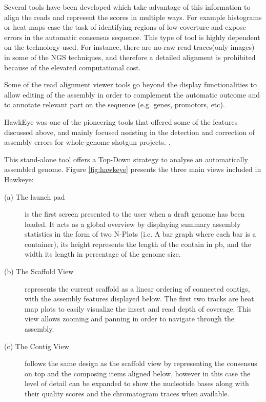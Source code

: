 Several tools have been developed which take advantage of this information to align the reads and represent the scores in multiple ways. For example histograms or heat maps ease the task of identifying regions of low coverture and expose errors in the automatic consensus sequence. This type of tool is highly dependent on the technology used. For instance, there are no raw read traces(only images) in some of the NGS techniques, and therefore a detailed alignment is prohibited because of the elevated computational cost.

Some of the read alignment viewer tools go beyond the display functionalities to allow editing of the assembly in order to complement the automatic outcome and to annotate relevant part on the sequence (e.g. genes, promotors, etc).

HawkEye was one of the pioneering tools that offered some of the features discussed above, and mainly focused assisting in the detection and correction of assembly errors for whole-genome shotgun projects. \cite{SCH2007}. 

This stand-alone tool offers a Top-Down strategy to analyse an automatically assembled genome. Figure \ref{fig:hawkeye} presents the three main views included in Hawkeye: 
\begin{description}
\item[(a) The launch pad] is the first screen presented to the user when a draft genome has been loaded. It acts as a global overview by displaying summary assembly statistics in the form of two N-Plots (i.e. A bar graph where each bar is a container), its height represents the length of the contain in pb, and the width its length in percentage of the genome size.
\item[(b) The Scaffold View] represents the current scaffold as a linear ordering of connected contigs, with the assembly features displayed below. The first two tracks are heat map plots to easily visualize the insert and read depth of coverage. This view allows zooming and panning in order to navigate through the assembly.
\item[(c) The Contig View] follows the same design as the scaffold view by representing the consensus on top and the composing items aligned below, however in this case the level of detail can be expanded to show the nucleotide bases along with their quality scores and the chromatogram traces when available.
\end{description}

